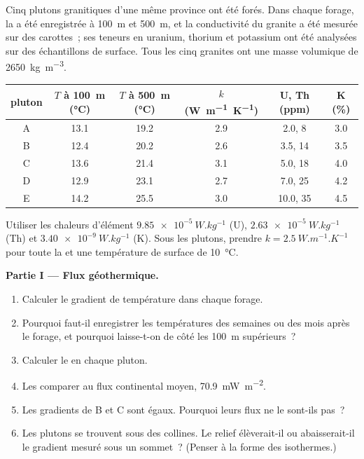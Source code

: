 \begin{problem}
\label{pb:b1:heat-budget:1}
Cinq plutons granitiques d'une même province ont été forés. Dans chaque forage, la
 a été enregistrée à \qty{100}{m} et \qty{500}{m}, et la
conductivité du granite a été mesurée sur des carottes~; ses teneurs en uranium,
thorium et potassium ont été analysées sur des échantillons de surface. Tous les
cinq granites ont une masse volumique de \qty{2650}{kg.m^{-3}}.
\begin{center}
\small
\begin{tabular}{cccccc}
\hline
pluton & $T$ à \qty{100}{m} (\unit{\degreeCelsius}) & $T$ à \qty{500}{m} (\unit{\degreeCelsius}) & $k$ (\unit{W.m^{-1}.K^{-1}}) & U, Th (ppm) & K (\unit{\percent}) \\
\hline
A & 13.1 & 19.2 & 2.9 & 2.0, 8 & 3.0 \\
B & 12.4 & 20.2 & 2.6 & 3.5, 14 & 3.5 \\
C & 13.6 & 21.4 & 3.1 & 5.0, 18 & 4.0 \\
D & 12.9 & 23.1 & 2.7 & 7.0, 25 & 4.2 \\
E & 14.2 & 25.5 & 3.0 & 10.0, 35 & 4.5 \\
\hline
\end{tabular}
\end{center}
Utiliser les chaleurs d'élément $\qty{9.85e-5}{W.kg^{-1}}$ (U), $\qty{2.63e-5}{W.kg^{-1}}$
(Th) et $\qty{3.40e-9}{W.kg^{-1}}$ (K). Sous les plutons, prendre
$k = \qty{2.5}{W.m^{-1}.K^{-1}}$ pour toute la  et une température de surface de
\qty{10}{\degreeCelsius}.

\medskip
\noindent\textbf{Partie I --- Flux géothermique.}
\begin{enumerate}
  \item Calculer le gradient de température dans chaque forage.
  \item Pourquoi faut-il enregistrer les températures des semaines ou des mois après
        le forage, et pourquoi laisse-t-on de côté les \qty{100}{m} supérieurs~?
  \item Calculer le  en chaque pluton.
  \item Les comparer au flux continental moyen, \qty{70.9}{mW.m^{-2}}.
  \item Les gradients de B et C sont égaux. Pourquoi leurs flux ne le sont-ils pas~?
  \item Les plutons se trouvent sous des collines. Le relief élèverait-il ou
        abaisserait-il le gradient mesuré sous un sommet~? (Penser à la forme des
        isothermes.)
\end{enumerate}


\end{problem}
